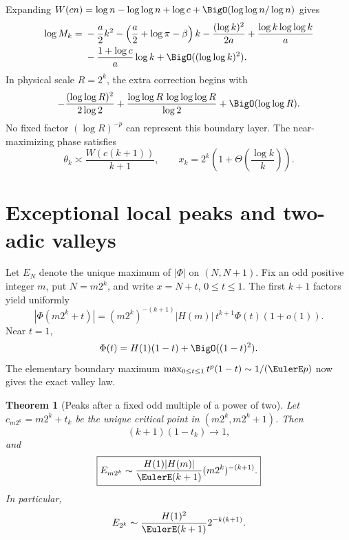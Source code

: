 \documentclass[11pt]{article}
\newtheorem{theorem}{Theorem}[section]
\theoremstyle{definition}
\theoremstyle{remark}
\begin{document}
Expanding \(W(cn)=\log n-\log\log n+\log c+\BigO(\log\log n/\log n)\)
gives
\begin{align}
 \log M_k={}&-\frac a2k^2
 -\left(\frac a2+\log\pi-\beta\right)k
 -\frac{(\log k)^2}{2a}
 +\frac{\log k\log\log k}{a}\notag\\
 &-\frac{1+\log c}{a}\log k
 +\BigO((\log\log k)^2).
 \label{eq:annulus-expanded}
\end{align}
In physical scale \(R=2^k\), the extra correction begins with
\begin{equation}
 -\frac{(\log\log R)^2}{2\log2}
 +\frac{\log\log R\,\log\log\log R}{\log2}
 +\BigO(\log\log R).
 \label{eq:second-lognormal}
\end{equation}
No fixed factor \((\log R)^{-p}\) can represent this boundary layer.  The
near-maximizing phase satisfies
\begin{equation}
 \theta_k\asymp\frac{W(c(k+1))}{k+1},
 \qquad
 x_k=2^k\left(1+\Theta\!\left(\frac{\log k}{k}\right)\right).
 \label{eq:max-location}
\end{equation}

\section{Exceptional local peaks and two-adic valleys}
\label{sec:valleys}

Let \(E_N\) denote the unique maximum of \(|\Phi|\) on \((N,N+1)\).
Fix an odd positive integer \(m\), put \(N=m2^k\), and write
\(x=N+t\), \(0\le t\le1\).  The first \(k+1\) factors yield uniformly
\begin{equation}
 |\Phi(m2^k+t)|
 =(m2^k)^{-(k+1)}|H(m)|\,t^{k+1}\Phi(t)(1+o(1)).
 \label{eq:near-m2k}
\end{equation}
Near \(t=1\),
\begin{equation}
 \Phi(t)=H(1)(1-t)+\BigO((1-t)^2).
 \label{eq:Phi-near-one}
\end{equation}
The elementary boundary maximum
\(\max_{0\le t\le1}t^p(1-t)\sim1/(\EulerE p)\) now gives the exact valley law.

\begin{theorem}[Peaks after a fixed odd multiple of a power of two]
\label{thm:twoadic}
Let \(c_{m2^k}=m2^k+t_k\) be the unique critical point in
\((m2^k,m2^k+1)\).  Then
\begin{equation}
 (k+1)(1-t_k)\longrightarrow1,
 \label{eq:twoadic-location}
\end{equation}
and
\begin{equation}
 \boxed{
 E_{m2^k}\sim
 \frac{H(1)|H(m)|}{\EulerE(k+1)}(m2^k)^{-(k+1)}.}
 \label{eq:twoadic-peak}
\end{equation}
In particular,
\begin{equation}
 E_{2^k}\sim\frac{H(1)^2}{\EulerE(k+1)}2^{-k(k+1)}.
 \label{eq:power-two-peak}
\end{equation}
\end{theorem}
\end{document}
